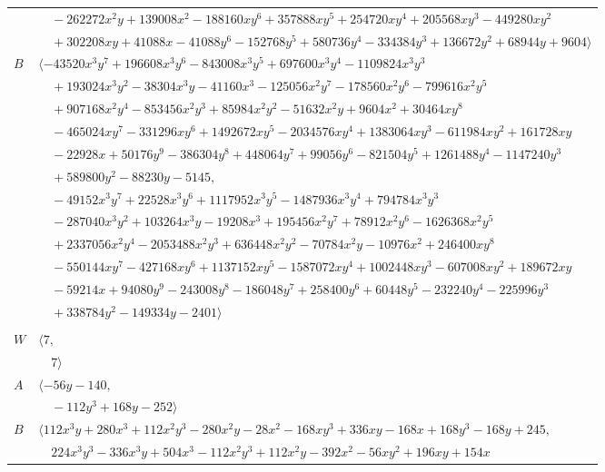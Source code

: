 \documentclass[11pt]{article}
\begin{document}
\begin{longtable}{@{}ll@{}}
 & $\quad -262272x^{2}y+139008x^{2}-188160xy^{6}+357888xy^{5}+254720xy^{4}+205568xy^{3}-449280xy^{2}$\\
 & $\quad +302208xy+41088x-41088y^{6}-152768y^{5}+580736y^{4}-334384y^{3}+136672y^{2}+68944y+9604\rangle$\\
$B$ & $\langle -43520x^{3}y^{7}+196608x^{3}y^{6}-843008x^{3}y^{5}+697600x^{3}y^{4}-1109824x^{3}y^{3}$\\
 & $\quad +193024x^{3}y^{2}-38304x^{3}y-41160x^{3}-125056x^{2}y^{7}-178560x^{2}y^{6}-799616x^{2}y^{5}$\\
 & $\quad +907168x^{2}y^{4}-853456x^{2}y^{3}+85984x^{2}y^{2}-51632x^{2}y+9604x^{2}+30464xy^{8}$\\
 & $\quad -465024xy^{7}-331296xy^{6}+1492672xy^{5}-2034576xy^{4}+1383064xy^{3}-611984xy^{2}+161728xy$\\
 & $\quad -22928x+50176y^{9}-386304y^{8}+448064y^{7}+99056y^{6}-821504y^{5}+1261488y^{4}-1147240y^{3}$\\
 & $\quad +589800y^{2}-88230y-5145,$\\
 & $\quad -49152x^{3}y^{7}+22528x^{3}y^{6}+1117952x^{3}y^{5}-1487936x^{3}y^{4}+794784x^{3}y^{3}$\\
 & $\quad -287040x^{3}y^{2}+103264x^{3}y-19208x^{3}+195456x^{2}y^{7}+78912x^{2}y^{6}-1626368x^{2}y^{5}$\\
 & $\quad +2337056x^{2}y^{4}-2053488x^{2}y^{3}+636448x^{2}y^{2}-70784x^{2}y-10976x^{2}+246400xy^{8}$\\
 & $\quad -550144xy^{7}-427168xy^{6}+1137152xy^{5}-1587072xy^{4}+1002448xy^{3}-607008xy^{2}+189672xy$\\
 & $\quad -59214x+94080y^{9}-243008y^{8}-186048y^{7}+258400y^{6}+60448y^{5}-232240y^{4}-225996y^{3}$\\
 & $\quad +338784y^{2}-149334y-2401\rangle$\\
\addlinespace[2pt]
\multicolumn{2}{@{}p{0.97\textwidth}@{}}{$i=42$, $D_i=2$, $\rho_{ij}$: $0{:}2, \allowbreak 37{:}2$}\\
$W$ & $\langle 7,$\\
 & $\quad 7\rangle$\\
$A$ & $\langle -56y-140,$\\
 & $\quad -112y^{3}+168y-252\rangle$\\
$B$ & $\langle 112x^{3}y+280x^{3}+112x^{2}y^{3}-280x^{2}y-28x^{2}-168xy^{3}+336xy-168x+168y^{3}-168y+245,$\\
 & $\quad 224x^{3}y^{3}-336x^{3}y+504x^{3}-112x^{2}y^{3}+112x^{2}y-392x^{2}-56xy^{2}+196xy+154x$\\

\end{longtable}
\end{document}
